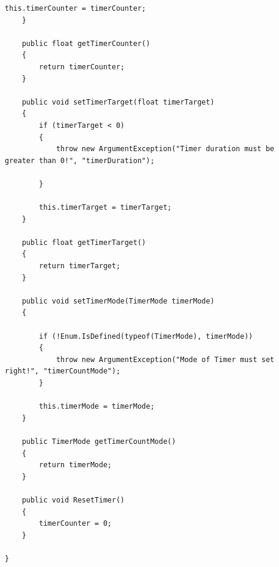 \documentclass[10pt,a4paper]{article}
\begin{document}
\begin{lstlisting}[caption={Skrypt 'Timer' - wykonywanie akcji po ustawionym uprzednio czasie}]
        this.timerCounter = timerCounter;
    }

    public float getTimerCounter()
    {
        return timerCounter;
    }

    public void setTimerTarget(float timerTarget)
    {
        if (timerTarget < 0)
        {
            throw new ArgumentException("Timer duration must be greater than 0!", "timerDuration");

        }

        this.timerTarget = timerTarget;
    }

    public float getTimerTarget()
    {
        return timerTarget;
    }

    public void setTimerMode(TimerMode timerMode)
    {

        if (!Enum.IsDefined(typeof(TimerMode), timerMode))
        {
            throw new ArgumentException("Mode of Timer must set right!", "timerCountMode");
        }

        this.timerMode = timerMode;
    }

    public TimerMode getTimerCountMode()
    {
        return timerMode;
    }

    public void ResetTimer()
    {
        timerCounter = 0;
    }

}
\end{lstlisting}
\end{document}
